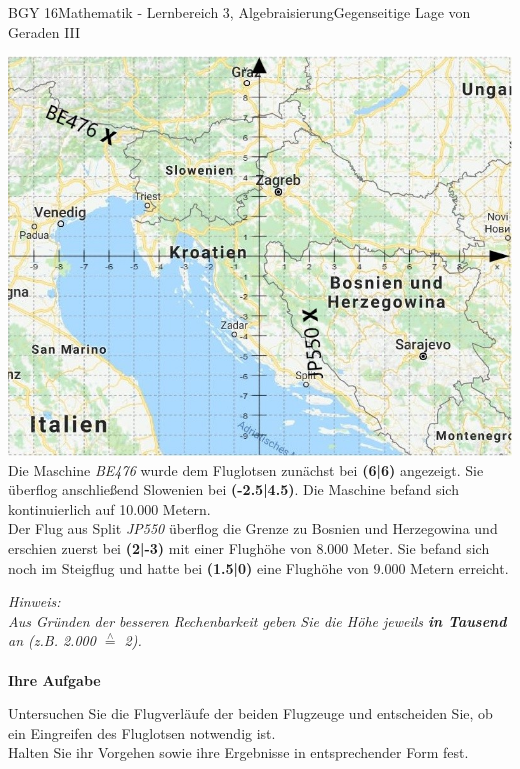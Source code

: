 \documentclass[oneside,openany,headings=optiontotoc,11pt,numbers=noenddot]{scrreprt}
\begin{document}
	\begin{worksheet}{BGY 16}{Mathematik - Lernbereich 3, Algebraisierung}{Gegenseitige Lage von Geraden III}
		
		\begin{framed}
		\noindent
		\includegraphics[scale=0.73]{Bilder/KroatienKoordFluge.jpg}\\
		Die Maschine \textit{BE476} wurde dem Fluglotsen zunächst bei \textbf{(6|6)} angezeigt. Sie überflog anschließend Slowenien bei \textbf{(-2.5|4.5)}. Die Maschine befand sich kontinuierlich auf 10.000 Metern.\\
		Der Flug aus Split \textit{JP550} überflog die Grenze zu Bosnien und Herzegowina und erschien zuerst bei \textbf{(2|-3)} mit einer Flughöhe von 8.000 Meter. Sie befand sich noch im Steigflug und hatte bei \textbf{(1.5|0)} eine Flughöhe von 9.000 Metern erreicht.\\
		\par
		\small{\textit{Hinweis:\\Aus Gründen der besseren Rechenbarkeit geben Sie die Höhe jeweils \textbf{in Tausend} an (z.B. 2.000 \(\overset{\wedge}{=}\) 2).}}\\
		\hdashrule[0.5ex][x]{\textwidth}{0.1mm}{8mm 2pt}\\
		\Large{\textbf{Ihre Aufgabe}}
		\normalsize
		\par\bigskip\noindent
		Untersuchen Sie die Flugverläufe der beiden Flugzeuge und entscheiden Sie, ob ein Eingreifen des Fluglotsen notwendig ist.\\
		Halten Sie ihr Vorgehen sowie ihre Ergebnisse in entsprechender Form fest.
		\end{framed}
	\end{worksheet}
\end{document}
